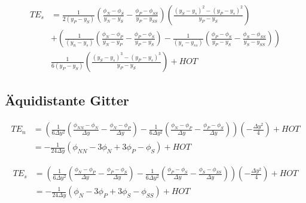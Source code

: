 \documentclass[11pt, ngerman,colorback,accentcolor=tud2d]{tudreport}
\begin{document}
\begin{align*}
  TE_s &= \frac{1}{2 (y_P-y_S)} \left({
\frac{\phi_{N}-\phi_S}{y_{N}-y_S}-\frac{\phi_P-\phi_{SS}}{y_P-y_{SS}}}\right)
  \left({\frac{{(y_S-y_s)}^2-{(y_P-y_s)}^2}{y_P-y_S}}\right)\\
&+
\left({
\frac{1}{(y_n-y_s)}
\left({\frac{\phi_N-\phi_P}{y_N-y_P}-\frac{\phi_P-\phi_S}{y_P-y_S} }\right)
-\frac{1}{(y_s-y_{ss})}
\left({\frac{\phi_P-\phi_S}{y_P-y_S} - \frac{\phi_S-\phi_{SS}}{y_S-y_{SS}}  }\right)
}\right)\\
&\frac{1}{6(y_P-y_S)}\left({\frac{{(y_S-y_s)}^3-{(y_P-y_s)}^3}{y_P-y_S}}\right)
  +HOT
\end{align*}

\subsection{Äquidistante Gitter}

\begin{align*}
  {TE}_n &= \left({
\frac{1}{6\Delta y^2}
\left({\frac{\phi_{NN}-\phi_N}{\Delta y}-\frac{\phi_N-\phi_P}{\Delta y} }\right)
-\frac{1}{6\Delta y^2}
\left({\frac{\phi_N-\phi_P}{\Delta y} - \frac{\phi_P-\phi_S}{\Delta y}  }\right)
}\right)\left({-\frac{\Delta y^2}{4} }\right)+HOT\\
&= -\frac{1}{24\Delta y}\left({
\phi_{NN}-3\phi_N+3\phi_P-\phi_S}\right)+HOT
\end{align*}

\begin{align*}
  TE_s &=\left({
\frac{1}{6 \Delta y^2}
\left({\frac{\phi_N-\phi_P}{\Delta y}-\frac{\phi_P-\phi_S}{\Delta y} }\right)
-\frac{1}{6\Delta y^2}
\left({\frac{\phi_P-\phi_S}{\Delta y} - \frac{\phi_S-\phi_{SS}}{\Delta y}  }\right)
}\right)
\left({-\frac{\Delta y^2}{4} }\right)+HOT\\
&= -\frac{1}{24 \Delta y}\left({
\phi_N-3\phi_P+3\phi_S-\phi_{SS}}\right)+HOT
\end{align*}
\end{document}
